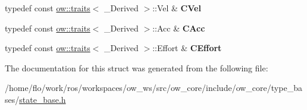 \begin{DoxyCompactItemize}
\item 
typedef const \hyperlink{structow_1_1traits}{ow\+::traits}$<$ \+\_\+\+Derived $>$\+::Vel \& {\bfseries C\+Vel}\hypertarget{structow__core_1_1StateBaseTraits_3_01__Derived_00_010_01_4_acfccc8cfd1fd1a53d52eeaa51dd32306}{}\label{structow__core_1_1StateBaseTraits_3_01__Derived_00_010_01_4_acfccc8cfd1fd1a53d52eeaa51dd32306}

\item 
typedef const \hyperlink{structow_1_1traits}{ow\+::traits}$<$ \+\_\+\+Derived $>$\+::Acc \& {\bfseries C\+Acc}\hypertarget{structow__core_1_1StateBaseTraits_3_01__Derived_00_010_01_4_aeaa5a495f8ec7379c2ff00d3191d05d6}{}\label{structow__core_1_1StateBaseTraits_3_01__Derived_00_010_01_4_aeaa5a495f8ec7379c2ff00d3191d05d6}

\item 
typedef const \hyperlink{structow_1_1traits}{ow\+::traits}$<$ \+\_\+\+Derived $>$\+::Effort \& {\bfseries C\+Effort}\hypertarget{structow__core_1_1StateBaseTraits_3_01__Derived_00_010_01_4_ae15f2667448d3c26c82c5231676d450a}{}\label{structow__core_1_1StateBaseTraits_3_01__Derived_00_010_01_4_ae15f2667448d3c26c82c5231676d450a}

\end{DoxyCompactItemize}


The documentation for this struct was generated from the following file\+:\begin{DoxyCompactItemize}
\item 
/home/flo/work/ros/workspaces/ow\+\_\+ws/src/ow\+\_\+core/include/ow\+\_\+core/type\+\_\+bases/\hyperlink{state__base_8h}{state\+\_\+base.\+h}\end{DoxyCompactItemize}

